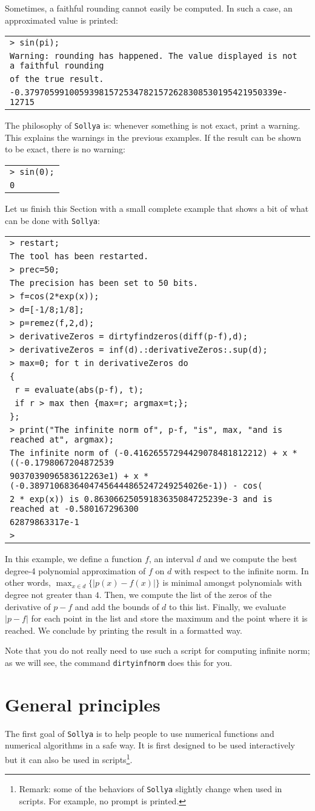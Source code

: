 \documentclass[a4paper]{article}
\newcommand{\com}[1]{\texttt{#1}}
\newcommand{\sollya}{\texttt{Sollya}\xspace}
\newcommand{\code}[1]{
\begin{center}
\begin{tabular}{|p{14.8cm}|}
\hline
#1
\hline
\end{tabular}
\end{center}
}
\newcommand{\ligne}[1]{\texttt{#1}\\}
\begin{document}
Sometimes, a faithful rounding cannot easily be computed. In such a case, an approximated value is printed:

\code{
\ligne{> sin(pi);}
\ligne{Warning: rounding has happened. The value displayed is not a faithful rounding}
\ligne{of the true result.}
\ligne{-0.379705991005939815725347821572628308530195421950339e-12715}
}

The philosophy of \sollya is: whenever something is not exact, print a warning. This explains the warnings in the previous examples. If the result can be shown to be exact, there is no warning:

\code{
\ligne{> sin(0);}
\ligne{0}
}

Let us finish this Section with a small complete example that shows a bit of what can be done with \sollya:

\code{
\ligne{>  restart;}
\ligne{The tool has been restarted.}
\ligne{> prec=50;}
\ligne{The precision has been set to 50 bits.}
\ligne{> f=cos(2*exp(x));}
\ligne{> d=[-1/8;1/8];}
\ligne{> p=remez(f,2,d);}
\ligne{> derivativeZeros = dirtyfindzeros(diff(p-f),d);}
\ligne{> derivativeZeros = inf(d).:derivativeZeros:.sup(d);}
\ligne{> max=0; for t in derivativeZeros do}
\ligne{\{}
\ligne{  r = evaluate(abs(p-f), t);}
\ligne{  if r > max then \{max=r; argmax=t;\};}
\ligne{\};}
\ligne{> print("The infinite norm of", p-f, "is", max, "and is reached at", argmax);}
\ligne{The infinite norm of (-0.41626557294429078481812212) + x * ((-0.1798067204872539}
\ligne{9037039096583612263e1) + x * (-0.38971068364047456444865247249254026e-1)) - cos(}
\ligne{2 * exp(x)) is 0.86306625059183635084725239e-3 and is reached at -0.580167296300}
\ligne{62879863317e-1}
\ligne{>}
}

In this example, we define a function $f$, an interval $d$ and we compute the best degree-4 polynomial approximation of $f$ on $d$ with respect to the infinite norm. In other words, $\max_{x \in d} \{|p(x)-f(x)|\}$ is minimal amongst polynomials with degree not greater than $4$. Then, we compute the list of the zeros of the derivative of $p-f$ and add the bounds of $d$ to this list. Finally, we evaluate $|p-f|$ for each point in the list and store the maximum and the point where it is reached. We conclude by printing the result in a formatted way.

Note that you do not really need to use such a script for computing infinite norm; as we will see, the command \com{dirtyinfnorm} does this for you.

\section{General principles}
The first goal of \sollya is to help people to use numerical functions and numerical algorithms in a safe way. It is first designed to be used interactively but it can also be used in scripts\footnote{Remark: some of the behaviors of \sollya slightly change when used in scripts. For example, no prompt is printed.}.
\end{document}
